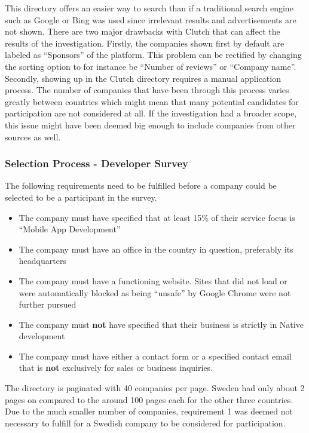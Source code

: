 \documentclass[a4paper,12pt]{article}
\begin{document}
This directory offers an easier way to search than if a traditional search engine such as Google or Bing was used since irrelevant results and advertisements are not shown. There are two major drawbacks with Clutch that can affect the results of the investigation. Firstly, the companies shown first by default are labeled as “Sponsors” of the platform. This problem can be rectified by changing the sorting option to for instance be “Number of reviews” or “Company name”. Secondly, showing up in the Clutch directory requires a manual application process. The number of companies that have been through this process varies greatly between countries which might mean that many potential candidates for participation are not considered at all. If the investigation had a broader scope, this issue might have been deemed big enough to include companies from other sources as well.

\subsubsection{Selection Process - Developer Survey}
\label{Project_participantSelection_processDevs}
The following requirements need to be fulfilled before a company could be selected to be a participant in the survey.

\begin{itemize}
    \item The company must have specified that at least 15\% of their service focus is “Mobile App Development”
    \item The company must have an office in the country in question, preferably its headquarters
    \item The company must have a functioning website. Sites that did not load or were automatically blocked as being “unsafe” by Google Chrome were not further pursued
    \item The company must \textbf{not} have specified that their business is strictly in Native development
    \item The company must have either a contact form or a specified contact email that is \textbf{not} exclusively for sales or business inquiries.
\end{itemize}

The directory is paginated with 40 companies per page. Sweden had only about 2 pages on compared to the around 100 pages each for the other three countries. Due to the much smaller number of companies, requirement 1 was deemed not necessary to fulfill for a Swedish company to be considered for participation.
\end{document}
